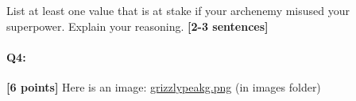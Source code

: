 \documentclass[11pt]{article}
\begin{document}
\begin{enumerate}[(a)]
\begin{enumerate}[(i)]
\begin{tcolorbox}[colback=orange!5!white,colframe=orange!75!black]
    List at least one value that is at stake if your archenemy misused your superpower. Explain your reasoning. \textbf{[2-3 sentences]}
    \end{tcolorbox}
    
    
    \end{enumerate}

\end{enumerate}



\pagebreak
\paragraph{Q4:} \textbf{[6 points]} Here is an image: \href{run:images/grizzlypeakg.png}{grizzlypeakg.png} (in images folder)
\end{document}
